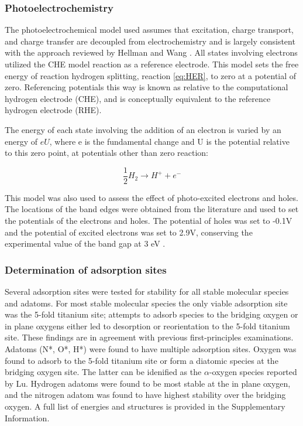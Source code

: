 \documentclass[journal=ascecg,manuscript=article,articletitle=true]{achemso}
\begin{document}
\subsubsection{Photoelectrochemistry}
The photoelectrochemical model used assumes that excitation, charge transport, and charge transfer are decoupled from electrochemistry and is largely consistent with the approach reviewed by Hellman and Wang \cite{Hellman2017}. All states involving electrons utilized the CHE model reaction as a reference electrode. This model sets the free energy of reaction hydrogen splitting, reaction \ref{eq:HER}, to zero at a potential of zero. Referencing potentials this way is known as relative to the computational hydrogen electrode (CHE), and is conceptually equivalent to the reference hydrogen electrode (RHE)\cite{Peterson_2010}.

The energy of each state involving the addition of an electron is varied by an energy of $eU$, where e is the fundamental change and U is the potential relative to this zero point, at potentials other than zero reaction:

\begin{equation}
	\label{eq:HER}
	\frac{1}{2}H_2\rightarrow H^{+}+e^{-}
\end{equation}

This model was also used to assess the effect of photo-excited electrons and holes. The locations of the band edges were obtained from the literature \cite{Nozik_1996} and used to set the potentials of the electrons and holes. The potential of holes was set to -0.1V and the potential of excited electrons was set to 2.9V, conserving the experimental value of the band gap at 3 eV \cite{Scanlon_2013}. 

\subsubsection{Determination of adsorption sites}

Several adsorption sites were tested for stability for all stable molecular species and adatoms. For most stable molecular species the only viable adsorption site was the 5-fold titanium site; attempts to adsorb species to the bridging oxygen or in plane oxygens either led to desorption or reorientation to the 5-fold titanium site. These findings are in agreement with previous first-principles examinations.\cite{Sorescu2000,Stodt2013} Adatoms (N*, O*, H*) were found to have multiple adsorption sites. Oxygen was found to adsorb to the 5-fold titanium site or form a diatomic species at the bridging oxygen site. The latter can be idenified as the $\alpha$-oxygen species reported by Lu.\cite{Lu1994} Hydrogen adatoms were found to be most stable at the in plane oxygen, and the nitrogen adatom was found to have highest stability over the bridging oxygen. A full list of energies and structures is provided in the Supplementary Information.
\end{document}
